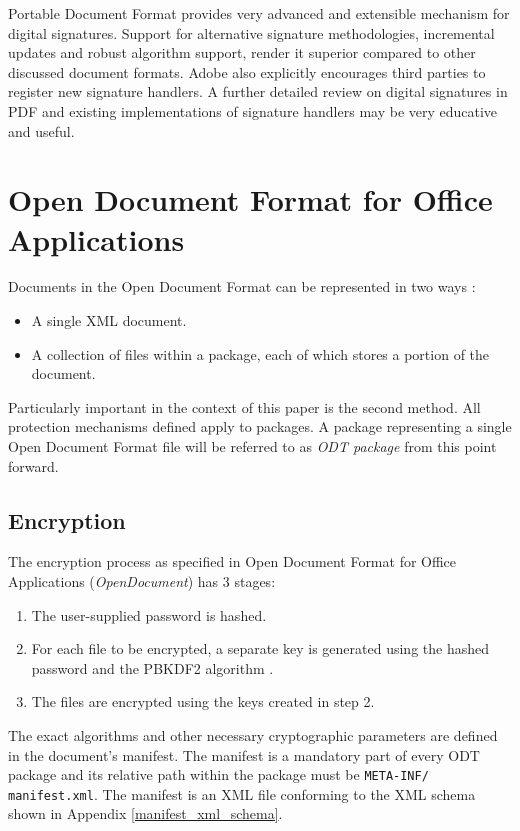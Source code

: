 \documentclass[11pt,oneside]{fithesis2}
\begin{document}
Portable Document Format provides very advanced and extensible mechanism for digital signatures. Support for alternative signature methodologies, incremental updates and robust algorithm support, render it superior compared to other discussed document formats. Adobe also explicitly encourages third parties to register new signature handlers. A further detailed review on digital signatures in PDF and existing implementations of signature handlers may be very educative and useful.  

\chapter{Open Document Format for Office Applications}

Documents in the Open Document Format can be represented in two ways \cite{odt_spec}:

\begin{itemize}
\setlength\itemsep{0.1em}
\item{A single XML document.}
\item{A collection of files within a package, each of which stores a portion of the document.}
\end{itemize}

Particularly important in the context of this paper is the second method. All protection mechanisms defined apply to packages. A package representing a single Open Document Format file will be referred to as \textit{ODT package} from this point forward.

\section{Encryption}\label{odt_enc}

The encryption process as specified in Open Document Format for Office Applications (\textit{OpenDocument}) \cite{odt_spec} has 3 stages:

\begin{enumerate}\label{encrypt_process_odt}
\setlength\itemsep{0.1em}
	\item{The user-supplied password is hashed.}
	\item{For each file to be encrypted, a separate key is generated using the hashed password and the PBKDF2 algorithm \cite{rfc2898}.}
	\item{The files are encrypted using the keys created in step 2.}
\end{enumerate}

The exact algorithms and other necessary cryptographic parameters are defined in the document's manifest. The manifest is a mandatory part of every ODT package and its relative path within the package must be \texttt{META-INF/}
\texttt{manifest.xml}. The manifest is an XML file conforming to the XML schema shown in Appendix \ref{manifest_xml_schema}.
\end{document}
